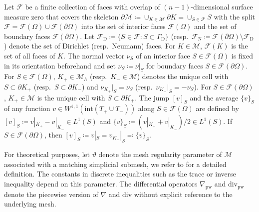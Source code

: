 \documentclass[a4paper]{amsart}
\numberwithin{equation}{section}
\renewcommand{\div}{\mathrm{div}}
\newcommand{\Mcal}{\mathcal{M}}
\newcommand{\pw}{\mathrm{pw}}
\theoremstyle{remark}
\begin{document}
Let $\mathcal{F}$ be a finite collection of faces with overlap of $(n-1)$-dimensional surface measure zero that covers the skeleton $\partial \Mcal \coloneqq \cup_{K \in \mathcal{M}} \partial K = \cup_{S \in \mathcal{F}} S$ with the split $\mathcal{F} = \mathcal{F}(\Omega) \cup \mathcal{F}(\partial \Omega)$ into the set of interior faces $\mathcal{F}(\Omega)$ and the set of boundary faces $\mathcal{F}(\partial \Omega)$.
Let $\mathcal{F}_\mathrm{D} \coloneqq \{S \in \mathcal{F} : S \subset \Gamma_\mathrm{D}\}$ (resp.~$\mathcal{F}_\mathrm{N} \coloneqq \mathcal{F}(\partial\Omega) \setminus \mathcal{F}_\mathrm{D}$) denote the set of Dirichlet (resp.~Neumann) faces. For $K \in \mathcal{M}$, $\mathcal{F}(K)$ is the set of all faces of $K$.
The normal vector $\nu_S$ of an interior face $S \in \mathcal{F}(\Omega)$ is fixed in its orientation beforehand and set $\nu_S \coloneqq \nu|_S$ for boundary faces $S \in \mathcal{F}(\partial \Omega)$.
For $S \in \mathcal{F}(\Omega)$, $K_+ \in \Mcal_h$ (resp.~$K_- \in \Mcal$) denotes the unique cell with $S \subset \partial K_{+}$ (resp.~$S \subset \partial K_-$) and $\nu_{K_+}|_S = \nu_S$ (resp.~$\nu_{K_-}|_S = -\nu_S$).
For $S \in \mathcal{F}(\partial \Omega)$, $K_+ \in \Mcal$ is the unique cell with $S \subset \partial K_+$.
The jump $[v]_S$ and the average $\{v\}_S$ of any function $v \in W^{1,1}(\mathrm{int}(T_+ \cup T_-))$ along $S \in \mathcal{F}(\Omega)$ are defined by $[v]_S \coloneqq v|_{K_+} - v|_{K_-} \in L^1(S)$ and $\{v\}_S \coloneqq (v|_{K_+} + v|_{K_-})/2 \in L^1(S)$.
If $S \in \mathcal{F}(\partial \Omega)$, then $[v]_S \coloneqq v|_S = v_{K_+}|_S \eqqcolon \{v\}_S$.

For theoretical purposes, let $\vartheta$ denote the mesh regularity parameter of $\Mcal$ associated with a matching simplicial submesh, we refer to \cite[Definition 1.38]{DiPietroErn2012} for a detailed definition. The constants in discrete inequalities such as the trace or inverse inequality depend on this parameter.
The differential operators $\nabla_\pw$ and $\div_\pw$ denote the piecewise version of $\nabla$ and $\div$ without explicit reference to the underlying mesh.
\end{document}
